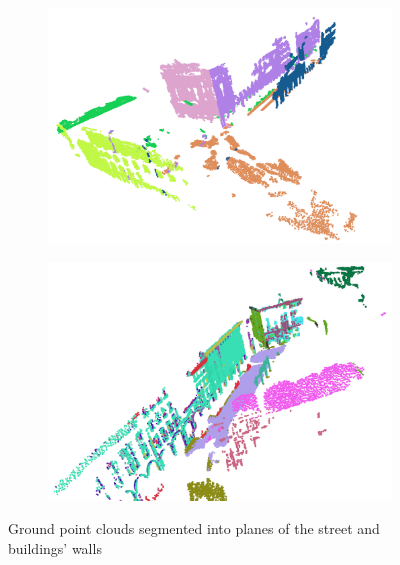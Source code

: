 \documentclass[11pt]{article}
\begin{document}
    \begin{figure}
        \centering
        \begin{subfigure}{0.45\textwidth}
            \centering
            \includegraphics[width=\linewidth]{images/experiment/4_1_3_multi_plane}
        \end{subfigure}
        \hfill
        \begin{subfigure}{0.45\textwidth}
            \centering
            \includegraphics[width=\linewidth]{images/experiment/multi_plane_2}
        \end{subfigure}
        \caption{Ground point clouds segmented into planes of the street and buildings' walls}
        \label{fig:multi_plane_seg}
    \end{figure}

    \clearpage
\end{document}

